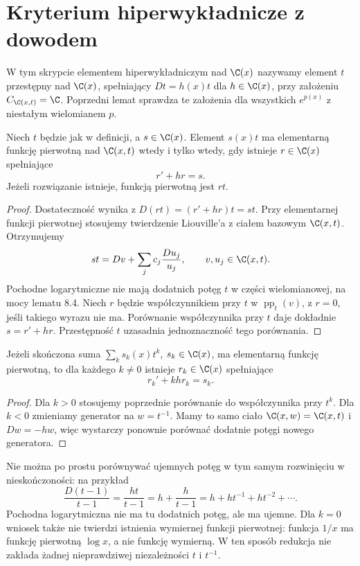 \section{Kryterium hiperwykładnicze z dowodem}

\begin{definicja}
W tym skrypcie elementem hiperwykładniczym nad $\C(x)$ nazywamy element $t$ przestępny nad $\C(x)$, spełniający $Dt=h(x)t$ dla $h\in\C(x)$, przy założeniu $C_{\C(x,t)}=\C$. Poprzedni lemat sprawdza te założenia dla wszystkich $e^{p(x)}$ z niestałym wielomianem $p$.
\end{definicja}

\begin{twierdzenie}
Niech $t$ będzie jak w definicji, a $s\in\C(x)$. Element $s(x)t$ ma elementarną funkcję pierwotną nad $\C(x,t)$ wtedy i tylko wtedy, gdy istnieje $r\in\C(x)$ spełniające
\begin{equation}\label{eq:hyperexp}
r'+hr=s.
\end{equation}
Jeżeli rozwiązanie istnieje, funkcją pierwotną jest $rt$.
\end{twierdzenie}
\begin{proof}
Dostateczność wynika z $D(rt)=(r'+hr)t=st$. Przy elementarnej funkcji pierwotnej stosujemy twierdzenie Liouville'a z ciałem bazowym $\C(x,t)$. Otrzymujemy
\[
st=Dv+\sum_j c_j\frac{Du_j}{u_j},\qquad v,u_j\in\C(x,t).
\]
Pochodne logarytmiczne nie mają dodatnich potęg $t$ w części wielomianowej, na mocy lematu 8.4. Niech $r$ będzie współczynnikiem przy $t$ w $\operatorname{pp}_t(v)$, z $r=0$, jeśli takiego wyrazu nie ma. Porównanie współczynnika przy $t$ daje dokładnie $s=r'+hr$. Przestępność $t$ uzasadnia jednoznaczność tego porównania.
\end{proof}

\begin{wniosek}
Jeżeli skończona suma $\sum_k s_k(x)t^k$, $s_k\in\C(x)$, ma elementarną funkcję pierwotną, to dla każdego $k\ne0$ istnieje $r_k\in\C(x)$ spełniające
\[
r_k'+khr_k=s_k.
\]
\end{wniosek}
\begin{proof}
Dla $k>0$ stosujemy poprzednie porównanie do współczynnika przy $t^k$. Dla $k<0$ zmieniamy generator na $w=t^{-1}$. Mamy to samo ciało $\C(x,w)=\C(x,t)$ i $Dw=-hw$, więc wystarczy ponownie porównać dodatnie potęgi nowego generatora.
\end{proof}

Nie można po prostu porównywać ujemnych potęg w tym samym rozwinięciu w nieskończoności: na przykład
\[
\frac{D(t-1)}{t-1}=\frac{ht}{t-1}
=h+\frac{h}{t-1}=h+ht^{-1}+ht^{-2}+\cdots.
\]
Pochodna logarytmiczna nie ma tu dodatnich potęg, ale ma ujemne. Dla $k=0$ wniosek także nie twierdzi istnienia wymiernej funkcji pierwotnej: funkcja $1/x$ ma funkcję pierwotną $\log x$, a nie funkcję wymierną. W ten sposób redukcja nie zakłada żadnej nieprawdziwej niezależności $t$ i $t^{-1}$.


